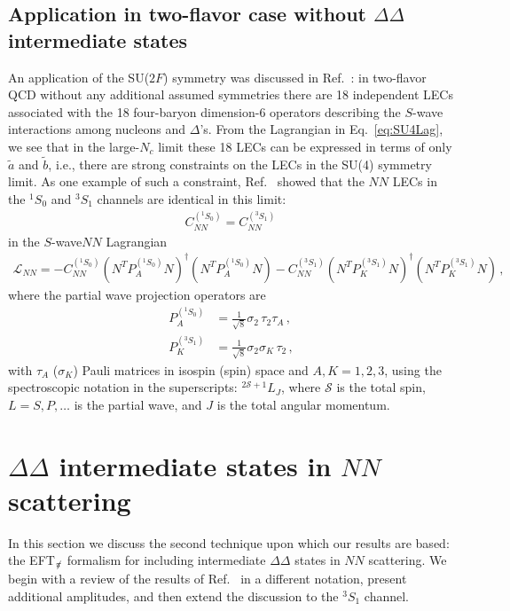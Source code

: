 \documentclass[nofootinbib, preprint, aps, prc, superscriptaddress,11pt]{revtex4-1}
\newcommand{\Nc}{\ensuremath{N_c}\xspace}
\newcommand{\NN}{\ensuremath{N\!N}\xspace}
\newcommand{\oneS}{\ensuremath{{{}^{1}\!S_0}}\xspace}
\newcommand{\threeS}{\ensuremath{{{}^{3}\!S_1}}\xspace}
\newcommand\Swave{$S$-wave\xspace}
\newcommand{\calL}{\ensuremath{\mathcal{L}}}
\newcommand{\1}{\mathbbm{1}}
\newcommand{\CNNsing}{\ensuremath{C_{\NN}^{(^1 \! S_0)}}\xspace}
\newcommand{\CNNtrip}{\ensuremath{C_{\NN}^{(^3 \! S_1)}}\xspace}
\newcommand{\at}{\ensuremath{\tilde{a}}\xspace}
\newcommand{\bt}{\ensuremath{\tilde{b}}\xspace}
\newcommand{\nopi}{\ensuremath{\pi\hskip-0.40em /}}
\newcommand{\eftnopi}{EFT$_{\nopi}$\xspace}
\newcommand{\D}{\ensuremath{\Delta}\xspace}
\newcommand{\DD}{\ensuremath{\Delta\Delta}\xspace}
\begin{document}
\subsection{Application in two-flavor case without \DD intermediate states \cite{Kaplan:1995yg}}
An application of the SU($2F$) symmetry was discussed in Ref.~\cite{Kaplan:1995yg}: in two-flavor QCD without any additional assumed symmetries there are 18 independent LECs associated with the 18 four-baryon dimension-6 operators describing the \Swave interactions among nucleons and {\D}'s.
From the Lagrangian in Eq.~\eqref{eq:SU4Lag}, we see that in the large-\Nc limit these 18 LECs can be expressed in terms of only $\at$ and $\bt$, i.e., there are strong constraints on the LECs in the SU(4) symmetry limit. As one example of such a constraint, Ref.~\cite{Kaplan:1995yg} showed that the \NN LECs in the $\oneS$ and $\threeS$ channels are identical in this limit:
\begin{align}
\label{eq:CNNequal}
    \CNNsing = \CNNtrip \,  
\end{align}
in the \Swave \NN Lagrangian 
\begin{align}\label{eq:NNLag}
    \calL_{\NN} = - \CNNsing (N^T P^{(\oneS)}_A N)^\dagger (N^T P^{(\oneS)}_A N)
    - \CNNtrip (N^T P^{(\threeS)}_K N)^\dagger (N^T P^{(\threeS)}_K N) \, ,
\end{align}
where the partial wave projection operators are 
\begin{align}\label{eq:NNProjectors1S0}
    P^{(\oneS)}_A & = \frac{1}{\sqrt{8}}\sigma_2 \, \tau_2\tau_A \, ,\\ 
    \label{eq:NNProjectors3S1}
    P^{(\threeS)}_K & = \frac{1}{\sqrt{8}}\sigma_2 \sigma_K \, \tau_2 \, ,
\end{align}
with $\tau_A$ ($\sigma_K$) Pauli matrices in isospin (spin) space and $A,K = 1,2,3$, using the spectroscopic notation in the superscripts: $^{2\mathscr{S}+1}L_J$, where $\mathscr{S}$ is the total spin, $L=S, P, \ldots$ is the partial wave, and $J$ is the total angular momentum.


\section{\DD intermediate states in \NN scattering}
\label{sec:DDIntermediate}


In this section we discuss the second technique upon which our results are based: the \eftnopi formalism for including intermediate \DD states in \NN scattering.  We begin with a review of the results of Ref.~\cite{Savage:1996tb} in a  different notation, present additional amplitudes, and then extend the discussion to the \threeS channel.
\end{document}
